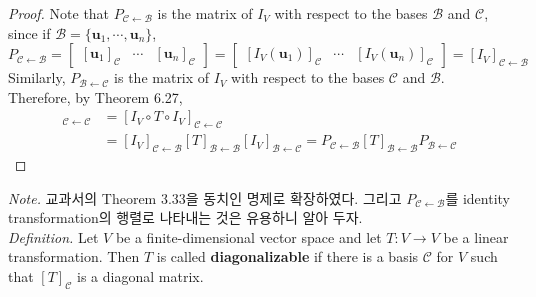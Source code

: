 \begin{proof}
	Note that $P_{ \mathcal{C} \leftarrow \mathcal{B} }$ is the matrix of $I_V$ with respect to the bases $\mathcal{B}$ and $\mathcal{C}$, since if $\mathcal{B} = \{\textbf{u}_1, \cdots, \textbf{u}_n\}$, \begin{equation*}
		P_{ \mathcal{C} \leftarrow \mathcal{B} } = \begin{bmatrix}
			\left[\textbf{u}_1\right]_\mathcal{C} & \cdots & \left[\textbf{u}_n\right]_\mathcal{C}
		\end{bmatrix} = \begin{bmatrix}
			\left[I_V(\textbf{u}_1)\right]_\mathcal{C} & \cdots & \left[I_V(\textbf{u}_n)\right]_\mathcal{C}
		\end{bmatrix} = [I_V]_{\mathcal{C} \leftarrow \mathcal{B}}
	\end{equation*} Similarly, $P_{ \mathcal{B} \leftarrow \mathcal{C} }$ is the matrix of $I_V$ with respect to the bases $\mathcal{C}$ and $\mathcal{B}$. Therefore, by Theorem 6.27, \begin{align*}
		[T]_{ \mathcal{C} \leftarrow \mathcal{C} } &= [I_V \circ T \circ I_V]_{ \mathcal{C} \leftarrow \mathcal{C} } \\
		&= [I_V]_{\mathcal{C} \leftarrow \mathcal{B}} [T]_{\mathcal{B} \leftarrow \mathcal{B}} [I_V]_{ \mathcal{B} \leftarrow \mathcal{C}} = P_{ \mathcal{C} \leftarrow \mathcal{B} }[T]_{ \mathcal{B} \leftarrow \mathcal{B} }P_{ \mathcal{B} \leftarrow \mathcal{C} }
	\end{align*}
\end{proof}

\textit{Note.} 교과서의 Theorem 3.33을 동치인 명제로 확장하였다. 그리고 $P_{ \mathcal{C} \leftarrow \mathcal{B} }$를 identity transformation의 행렬로 나타내는 것은 유용하니 알아 두자. \\
 
\textit{Definition.} Let $V$ be a finite-dimensional vector space and let $T: V \rightarrow V$ be a linear transformation. Then $T$ is called \textbf{diagonalizable} if there is a basis $\mathcal{C}$ for $V$ such that $[T]_\mathcal{C}$ is a diagonal matrix.

